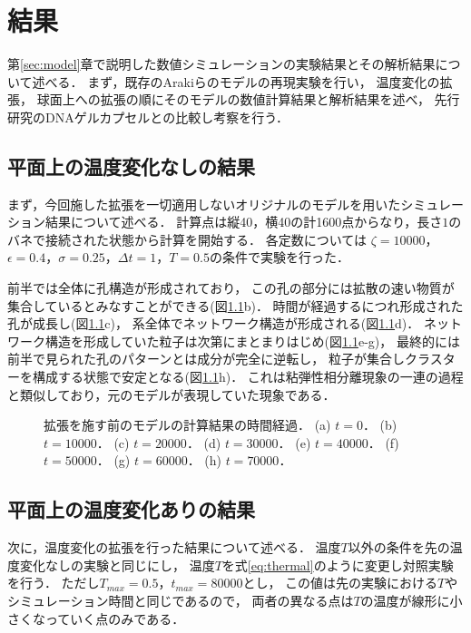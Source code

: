 \chapter{結果}

第\ref{sec:model}章で説明した数値シミュレーションの実験結果とその解析結果について述べる．
まず，既存のArakiらのモデルの再現実験を行い，
温度変化の拡張，
球面上への拡張の順にそのモデルの数値計算結果と解析結果を述べ，
先行研究のDNAゲルカプセルとの比較し考察を行う．

\section{平面上の温度変化なしの結果}

まず，今回施した拡張を一切適用しないオリジナルのモデルを用いたシミュレーション結果について述べる．
計算点は縦40，横40の計1600点からなり，長さ$1$のバネで接続された状態から計算を開始する．
各定数については
$\zeta=10000$，$\epsilon=0.4$，$\sigma=0.25$，$\Delta t=1$，$T=0.5$の条件で実験を行った．

前半では全体に孔構造が形成されており，
この孔の部分には拡散の速い物質が集合しているとみなすことができる(図\ref{fig:result_2d_without_anearing}b)．
時間が経過するにつれ形成された孔が成長し(図\ref{fig:result_2d_without_anearing}c)，
系全体でネットワーク構造が形成される(図\ref{fig:result_2d_without_anearing}d)．
ネットワーク構造を形成していた粒子は次第にまとまりはじめ(図\ref{fig:result_2d_without_anearing}e-g)，
最終的には前半で見られた孔のパターンとは成分が完全に逆転し，
粒子が集合しクラスターを構成する状態で安定となる(図\ref{fig:result_2d_without_anearing}h)．
これは粘弾性相分離現象の一連の過程と類似しており，元のモデルが表現していた現象である．

\begin{figure}
\centering

\caption{
    拡張を施す前のモデルの計算結果の時間経過．
    (a) $t=0$．
    (b) $t=10000$．
    (c) $t=20000$．
    (d) $t=30000$．
    (e) $t=40000$．
    (f) $t=50000$．
    (g) $t=60000$．
    (h) $t=70000$．
}
\label{fig:result_2d_without_anearing}
\end{figure}

\section{平面上の温度変化ありの結果}

次に，温度変化の拡張を行った結果について述べる．
温度$T$以外の条件を先の温度変化なしの実験と同じにし，
温度$T$を式\ref{eq:thermal}のように変更し対照実験を行う．
ただし$T_{max}=0.5$，$t_{max}=80000$とし，
この値は先の実験における$T$やシミュレーション時間と同じであるので，
両者の異なる点は$T$の温度が線形に小さくなっていく点のみである．

